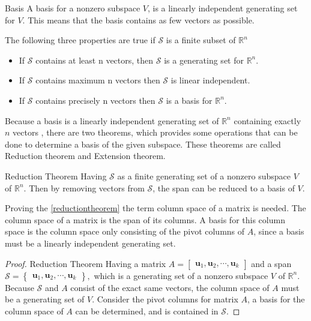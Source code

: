 \begin{definition}{Basis}
A basis for a nonzero subspace $V$, is a linearly independent generating set for $V$. This means that the basis contains as few vectors as possible.\cite[241]{LiAl}
\end{definition}
\noindent The following three properties are true if $\mathcal{S}$ is a finite subset of $\mathbb{R}^n$
\begin{itemize}
    \item If $\mathcal{S}$ contains at least n vectors, then $\mathcal{S}$ is a generating set for $\mathbb{R}^n$. 
    \item If $\mathcal{S}$ contains maximum n vectors then $\mathcal{S}$ is linear independent.
    \item If $\mathcal{S}$ contains precisely n vectors then $\mathcal{S}$ is a basis for $\mathbb{R}^n$.
\end{itemize}
Because a basis is a linearly independent generating set of $\mathbb{R}^n$ containing exactly $n$ vectors , there are two theorems, which provides some operations that can be done to determine a basis of the given subspace. These theorems are called Reduction theorem and Extension theorem.
\begin{theorem}{Reduction Theorem}
Having $\mathcal{S}$ as a finite generating set of a nonzero subspace $V$ of $\mathbb{R}^n$. Then by removing vectors from $\mathcal{S}$, the span can be reduced to a basis of $V$.
\cite[243]{LiAl}
\label{reductiontheorem}
\end{theorem}
Proving the \ref{reductiontheorem} the term column space of a matrix is needed. The column space of a matrix is the span of its columns. A basis for this column space is the column space only consisting of the pivot columns of $A$, since a basis must be a linearly independent generating set.
\begin{proof}{Reduction Theorem}
Having a matrix $A=\begin{bmatrix}
 \textbf{u}_1, \textbf{u}_2, \cdots, \textbf{u}_k
\end{bmatrix}$ and a span
$
\mathcal{S}=\begin{Bmatrix}
 \textbf{u}_1, \textbf{u}_2, \cdots, \textbf{u}_k
\end{Bmatrix}  
,$ which is a generating set of a nonzero subspace $V$ of $\mathbb{R}^n$. Because $\mathcal{S}$ and $A$ consist of the exact same vectors, the column space of $A$ must be a generating set of $V$. Consider the pivot columns for matrix $A$, a basis for the column space of $A$ can be determined, and is contained in $\mathcal{S}$. \qedsymbol
\end{proof}



